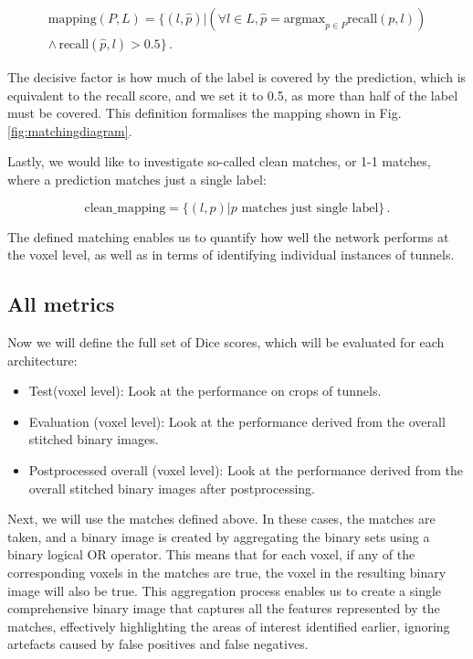 \documentclass[
  digital,     %
  oneside,     %
  nosansbold,  %
  nocolorbold, %
  lof,         %
  lot,         %
]{fithesis4}
\begin{document}
\begin{align*}
 \text{mapping}(P,L)= \{(l,\hat{p})|(\forall l \in L, \hat{p} = \text{argmax}_{p \in P} \text{recall}(p,l)) \\
 \land \, \text{recall}(\hat{p},l) > 0.5 \} \, .
\end{align*}

The decisive factor is how much of the label is covered by the prediction, which is equivalent to the recall score, and we set it to 0.5, as more than half of the label must be covered. This definition formalises the mapping shown in Fig. \ref{fig:matchingdiagram}.

Lastly, we would like to investigate so-called clean matches, or 1-1 matches, where a prediction matches just a single label:

\[ \text{clean\_mapping} = \{ (l, p) | p \text{ matches just single label} \} \, .\]

The defined matching enables us to quantify how well the network performs at the voxel level, as well as in terms of identifying individual instances of tunnels.

\subsection*{All metrics}

Now we will define the full set of Dice scores, which will be evaluated for each architecture:

\begin{itemize}
    \item{Test(voxel level): Look at the performance on crops of tunnels.}
    \item{Evaluation (voxel level): Look at the performance derived from the overall stitched binary images.}
   \item{Postprocessed overall (voxel level): Look at the performance derived from the overall stitched binary images after postprocessing.}
\end{itemize}

Next, we will use the matches defined above. In these cases, the matches are taken, and a binary image is created by aggregating the binary sets using a binary logical OR operator. This means that for each voxel, if any of the corresponding voxels in the matches are true, the voxel in the resulting binary image will also be true. This aggregation process enables us to create a single comprehensive binary image that captures all the features represented by the matches, effectively highlighting the areas of interest identified earlier, ignoring artefacts caused by false positives and false negatives.
\end{document}
